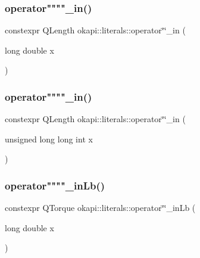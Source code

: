 \mbox{\label{namespaceokapi_1_1literals_afad4d7e9c13571cf2ec0dde7e0008a72}} 
\subsubsection{\texorpdfstring{operator""""\_in()}{operator""\_in()}\hspace{0.1cm}{\footnotesize\ttfamily [1/2]}}
{\footnotesize\ttfamily constexpr Q\+Length okapi\+::literals\+::operator\char`\"{}\char`\"{}\+\_\+in (\begin{DoxyParamCaption}\item[{long double}]{x }\end{DoxyParamCaption})}

\mbox{\label{namespaceokapi_1_1literals_a78c6b310757ea9a0e0c48315c194c366}} 
\subsubsection{\texorpdfstring{operator""""\_in()}{operator""\_in()}\hspace{0.1cm}{\footnotesize\ttfamily [2/2]}}
{\footnotesize\ttfamily constexpr Q\+Length okapi\+::literals\+::operator\char`\"{}\char`\"{}\+\_\+in (\begin{DoxyParamCaption}\item[{unsigned long long int}]{x }\end{DoxyParamCaption})}

\mbox{\label{namespaceokapi_1_1literals_aaa3c99e6571a76cd4088d2d55afd357d}} 
\subsubsection{\texorpdfstring{operator""""\_inLb()}{operator""\_inLb()}\hspace{0.1cm}{\footnotesize\ttfamily [1/2]}}
{\footnotesize\ttfamily constexpr Q\+Torque okapi\+::literals\+::operator\char`\"{}\char`\"{}\+\_\+in\+Lb (\begin{DoxyParamCaption}\item[{long double}]{x }\end{DoxyParamCaption})}

